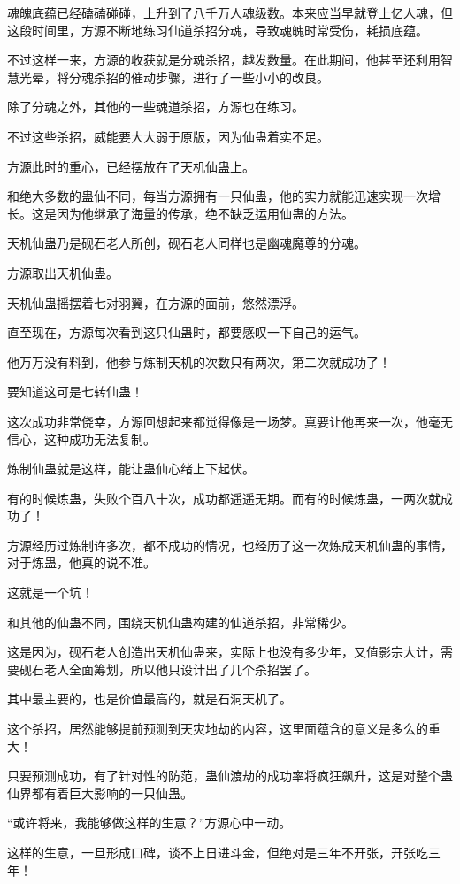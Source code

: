 \begin{this_body}
魂魄底蕴已经磕磕碰碰，上升到了八千万人魂级数。本来应当早就登上亿人魂，但这段时间里，方源不断地练习仙道杀招分魂，导致魂魄时常受伤，耗损底蕴。

不过这样一来，方源的收获就是分魂杀招，越发数量。在此期间，他甚至还利用智慧光晕，将分魂杀招的催动步骤，进行了一些小小的改良。

除了分魂之外，其他的一些魂道杀招，方源也在练习。

不过这些杀招，威能要大大弱于原版，因为仙蛊着实不足。

方源此时的重心，已经摆放在了天机仙蛊上。

和绝大多数的蛊仙不同，每当方源拥有一只仙蛊，他的实力就能迅速实现一次增长。这是因为他继承了海量的传承，绝不缺乏运用仙蛊的方法。

天机仙蛊乃是砚石老人所创，砚石老人同样也是幽魂魔尊的分魂。

方源取出天机仙蛊。

天机仙蛊摇摆着七对羽翼，在方源的面前，悠然漂浮。

直至现在，方源每次看到这只仙蛊时，都要感叹一下自己的运气。

他万万没有料到，他参与炼制天机的次数只有两次，第二次就成功了！

要知道这可是七转仙蛊！

这次成功非常侥幸，方源回想起来都觉得像是一场梦。真要让他再来一次，他毫无信心，这种成功无法复制。

炼制仙蛊就是这样，能让蛊仙心绪上下起伏。

有的时候炼蛊，失败个百八十次，成功都遥遥无期。而有的时候炼蛊，一两次就成功了！

方源经历过炼制许多次，都不成功的情况，也经历了这一次炼成天机仙蛊的事情，对于炼蛊，他真的说不准。

这就是一个坑！

和其他的仙蛊不同，围绕天机仙蛊构建的仙道杀招，非常稀少。

这是因为，砚石老人创造出天机仙蛊来，实际上也没有多少年，又值影宗大计，需要砚石老人全面筹划，所以他只设计出了几个杀招罢了。

其中最主要的，也是价值最高的，就是石洞天机了。

这个杀招，居然能够提前预测到天灾地劫的内容，这里面蕴含的意义是多么的重大！

只要预测成功，有了针对性的防范，蛊仙渡劫的成功率将疯狂飙升，这是对整个蛊仙界都有着巨大影响的一只仙蛊。

“或许将来，我能够做这样的生意？”方源心中一动。

这样的生意，一旦形成口碑，谈不上日进斗金，但绝对是三年不开张，开张吃三年！


\end{this_body}
